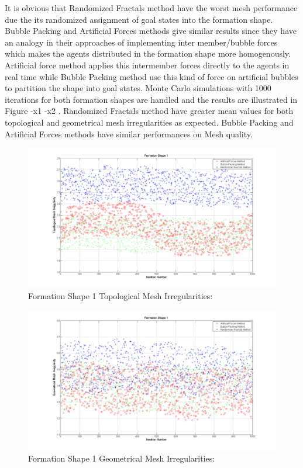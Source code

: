 		It is obvious that Randomized Fractals method have the worst mesh performance due the its randomized assignment of goal states into the formation shape. Bubble Packing and Artificial Forces methods give similar results since they have an analogy in their approaches of implementing inter member/bubble forces which makes the agents distributed in the formation shape more homogenously. Artificial force method applies this intermember forces directly to the agents in real time while Bubble Packing method use this kind of force on artificial bubbles to partition the shape into goal states. Monte Carlo simulations with 1000 iterations for both formation shapes are handled and the results are illustrated in Figure -x1 -x2 . Randomized Fractals method have greater mean values for both topological and geometrical mesh irregularities as expected.  Bubble Packing and Artificial Forces methods have similar performances on Mesh quality.
		
		
		
								\begin{figure}[H]
									\caption{Formation Shape 1 Topological Mesh Irregularities:}
									\centerline{\includegraphics[scale = 0.45]{Topological_Irr_1}}
								\end{figure} 	
		
				\begin{figure}[H]
					\caption{Formation Shape 1 Geometrical Mesh Irregularities:}
					\centerline{\includegraphics[scale = 0.45]{Geometrical_Irr_1}}
				\end{figure} 	

